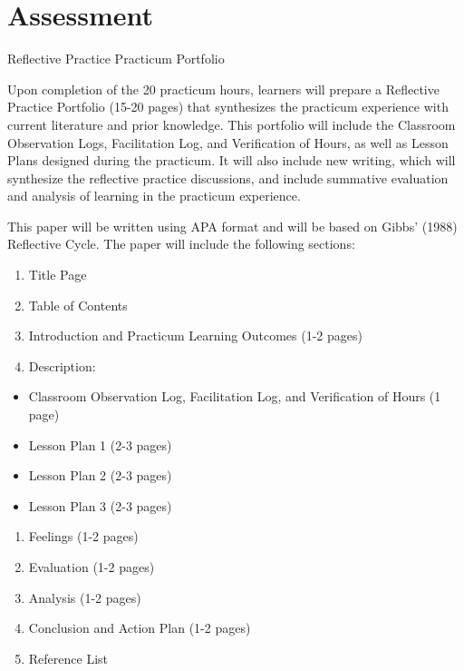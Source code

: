 \documentclass[
]{book}
\providecommand{\tightlist}{%
  \setlength{\itemsep}{0pt}\setlength{\parskip}{0pt}}
\begin{document}
\hypertarget{assessment-4}{%
\section*{Assessment}\label{assessment-4}}

\begin{assessment}
{Reflective Practice Practicum Portfolio}

Upon completion of the 20 practicum hours, learners will prepare a Reflective Practice Portfolio (15-20 pages) that synthesizes the practicum experience with current literature and prior knowledge. This portfolio will include the Classroom Observation Logs, Facilitation Log, and Verification of Hours, as well as Lesson Plans designed during the practicum. It will also include new writing, which will synthesize the reflective practice discussions, and include summative evaluation and analysis of learning in the practicum experience.

This paper will be written using APA format and will be based on Gibbs' (1988) Reflective Cycle. The paper will include the following sections:

\begin{enumerate}
\def\labelenumi{\arabic{enumi}.}
\tightlist
\item
  Title Page\\
\item
  Table of Contents\\
\item
  Introduction and Practicum Learning Outcomes (1-2 pages)\\
\item
  Description:\\
\end{enumerate}

\begin{itemize}
\tightlist
\item
  Classroom Observation Log, Facilitation Log, and Verification of Hours (1 page)\\
\item
  Lesson Plan 1 (2-3 pages)\\
\item
  Lesson Plan 2 (2-3 pages)\\
\item
  Lesson Plan 3 (2-3 pages)\\
\end{itemize}

\begin{enumerate}
\def\labelenumi{\arabic{enumi}.}
\setcounter{enumi}{4}
\tightlist
\item
  Feelings (1-2 pages)\\
\item
  Evaluation (1-2 pages)\\
\item
  Analysis (1-2 pages)\\
\item
  Conclusion and Action Plan (1-2 pages)\\
\item
  Reference List
\end{enumerate}


\end{assessment}
\end{document}
